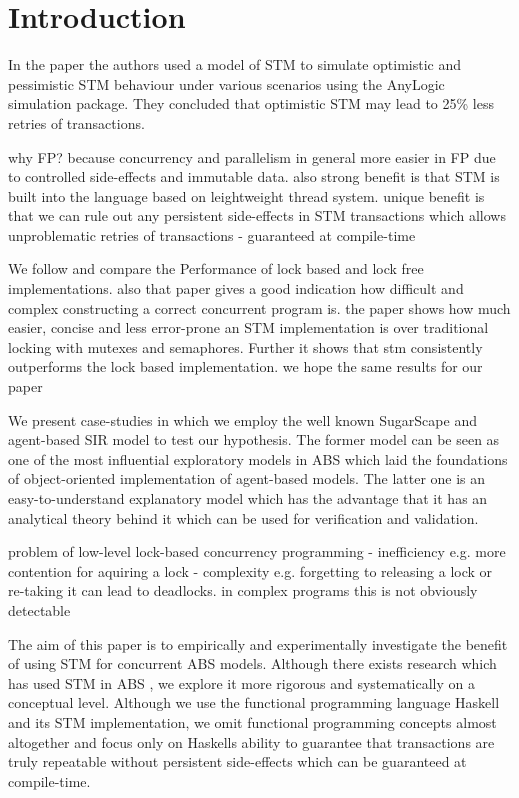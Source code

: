 \section{Introduction}

In the paper \cite{heindl_modeling_2009} the authors used a model of STM to simulate optimistic and pessimistic STM behaviour under various scenarios using the AnyLogic simulation package. They concluded that optimistic STM may lead to 25\% less retries of transactions.

why FP? because concurrency and parallelism in general more easier in FP due to controlled side-effects and immutable data. also strong benefit is that STM is built into the language based on leightweight thread system. unique benefit is that we can rule out any persistent side-effects in STM transactions which allows unproblematic retries of transactions - guaranteed at compile-time

We follow \cite{discolo_lock_2006} and compare the Performance of lock based and lock free implementations. also that paper gives a good indication how difficult and complex constructing a correct concurrent program is. the paper shows how much easier, concise and less error-prone an STM implementation is over traditional locking with mutexes and semaphores. Further it shows that stm consistently outperforms the lock based implementation. we hope the same results for our paper

We present case-studies in which we employ the well known SugarScape \citep{epstein_growing_1996} and agent-based SIR \citep{macal_agent-based_2010} model to test our hypothesis. The former model can be seen as one of the most influential exploratory models in ABS which laid the foundations of object-oriented implementation of agent-based models. The latter one is an easy-to-understand explanatory model which has the advantage that it has an analytical theory behind it which can be used for verification and validation.

problem of low-level lock-based concurrency programming
- inefficiency e.g. more contention for aquiring a lock
- complexity e.g. forgetting to releasing a lock or re-taking it can lead to deadlocks. in complex programs this is not obviously detectable

The aim of this paper is to empirically and experimentally investigate the benefit of using STM for concurrent ABS models. Although there exists research which has used STM in ABS \cite{bezirgiannis_improving_2013}, we explore it more rigorous and systematically on a conceptual level. Although we use the functional programming language Haskell and its STM implementation, we omit functional programming concepts almost altogether and focus only on Haskells ability to guarantee that transactions are truly repeatable without persistent side-effects which can be guaranteed at compile-time.

